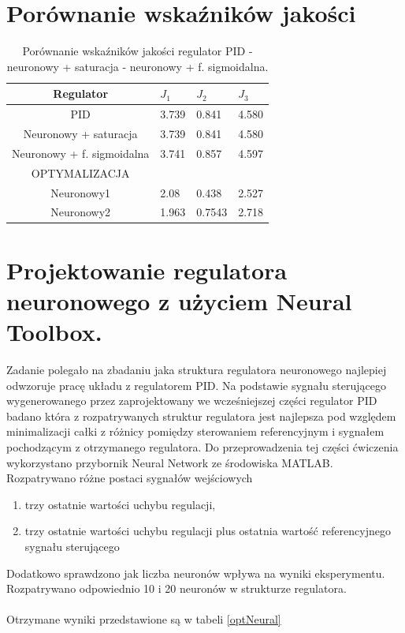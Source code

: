 \FloatBarrier
\newpage
\section{Porównanie wska\'zników jakości}
\begin{table}[h]
	\caption{Porównanie wska\'zników jakości regulator PID - neuronowy + saturacja - neuronowy + f. sigmoidalna.}
	\label{por_reg_pid_n_n}
	\centering
	
	\begin{tabular}{|c|M{2.5cm}|M{2.5cm}|M{2.5cm}|}
		\hline
		Regulator &$J_1$&$J_2$&$J_3$\\
		\hline
		PID &3.739&   0.841 &  4.580\\
		\hline
		Neuronowy + saturacja &3.739 &  0.841 &  4.580\\
		\hline
		Neuronowy + f. sigmoidalna & 3.741 &  0.857 &  4.597\\
		\hline
		OPTYMALIZACJA\\
		\hline
		Neuronowy1 & 2.08 & 0.438 &  2.527\\
		\hline
		Neuronowy2 & 1.963 &  0.7543 &  2.718\\
		\hline
	\end{tabular}
\end{table}
\FloatBarrier

\section{Projektowanie regulatora neuronowego z użyciem Neural Toolbox.}
	
Zadanie polegało na zbadaniu jaka struktura regulatora neuronowego najlepiej odwzoruje pracę układu z regulatorem PID. Na podstawie sygnału sterującego wygenerowanego przez zaprojektowany we wcześniejszej części regulator PID badano która z rozpatrywanych struktur regulatora jest najlepsza pod względem minimalizacji całki z różnicy pomiędzy sterowaniem referencyjnym i sygnałem pochodzącym z otrzymanego regulatora. Do przeprowadzenia tej części ćwiczenia wykorzystano przybornik Neural Network ze środowiska MATLAB. \\

Rozpatrywano różne postaci sygnałów wejściowych 
\begin{enumerate}
	\item trzy ostatnie wartości uchybu regulacji,
	\item trzy ostatnie wartości uchybu regulacji plus ostatnia wartość referencyjnego sygnału sterującego
\end{enumerate} 	
Dodatkowo sprawdzono jak liczba neuronów wpływa na wyniki eksperymentu. Rozpatrywano odpowiednio 10 i 20 neuronów w strukturze regulatora.\\
\\
Otrzymane wyniki przedstawione są w tabeli \ref{optNeural}

